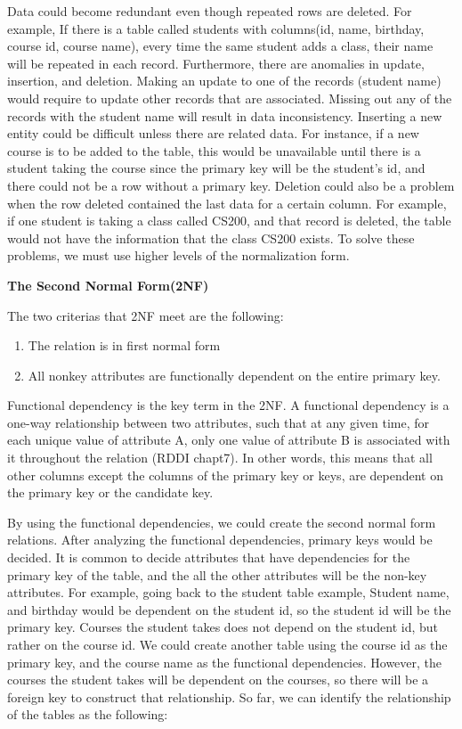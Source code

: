 Data could become redundant even though repeated rows are deleted. 
For example, If there is a table called students with columns(id, name, birthday, course id, course name), every time the same student adds a class, 
their name will be repeated in each record. Furthermore, there are anomalies in update, insertion, and deletion. 
Making an update to one of the records (student name) 
would require to update other records that are associated. Missing out any of the records with the student name will result in data inconsistency. 
Inserting a new entity could be difficult unless there are related data. For instance, if a new course is to be added to the table, 
this would be unavailable until there is a student taking the course since the primary key will be the student’s id, and there could not be a row without a primary key. 
Deletion could also be a problem when the row deleted contained the last data for a certain column. For example, 
if one student is taking a class called CS200, and that record is deleted, the table would not have the information that the class CS200 exists. 
To solve these problems, we must use higher levels of the normalization form.

\textbf{The Second Normal Form(2NF)}

The two criterias that 2NF meet are the following:
\begin{enumerate}
    \item The relation is in first normal form
    \item All nonkey attributes are functionally dependent on the entire primary key. 
\end{enumerate}

Functional dependency is the key term in the 2NF. A functional dependency is a one-way relationship between two attributes, 
such that at any given time, for each unique value of attribute A, only one value of attribute B is associated with it throughout the relation (RDDI chapt7). 
In other words, this means that all other columns except the columns of the primary key or keys, are dependent on the primary key or the candidate key. 

By using the functional dependencies, we could create the second normal form relations. After analyzing the functional dependencies, 
primary keys would be decided. It is common to decide attributes that have dependencies 
for the primary key of the table, and the all the other attributes will be the non-key attributes. 
For example, going back to the student table example, Student name, and birthday would be dependent on the student id, so the student id will be the primary key. 
Courses the student takes does not depend on the student id, but rather on the course id. 
We could create another table using the course id as the primary key, and the course name as the functional dependencies. 
However, the courses the student takes will be dependent on the courses, so there will be a foreign key to construct that relationship. 
So far, we can identify the relationship of the tables as the following:

